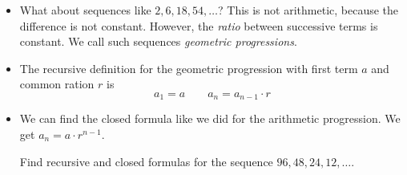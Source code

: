 \begin{itemize}
\item What about sequences like $2, 6, 18, 54, \ldots$?  This is not arithmetic, because the difference is not constant.  However, the {\em ratio} between successive terms is constant.  We call such sequences {\em geometric progressions}.

\item The recursive definition for the geometric progression with first term $a$ and common ration $r$ is 
\[a_1 = a \qquad a_n = a_{n-1}\cdot r \]
\item We can find the closed formula like we did for the arithmetic progression.  We get $a_n = a\cdot r^{n-1}$.

 Find recursive and closed formulas for the sequence $96, 48, 24, 12, \ldots$.

\end{itemize}





